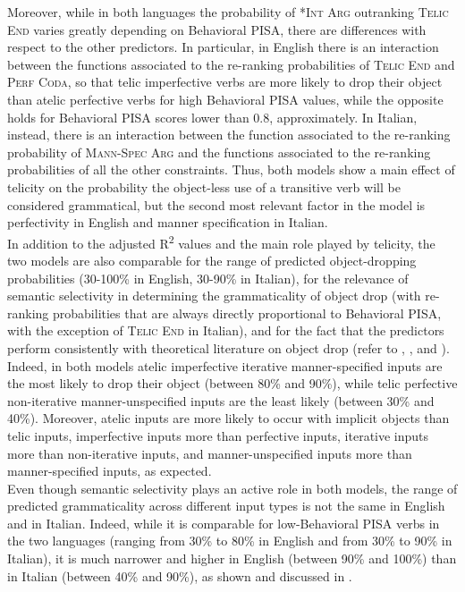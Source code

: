 Moreover, while in both languages the probability of \textsc{*Int Arg} outranking \textsc{Telic End} varies greatly depending on Behavioral PISA, there are differences with respect to the other predictors. In particular, in English there is an interaction between the functions associated to the re-ranking probabilities of \textsc{Telic End} and \textsc{Perf Coda}, so that telic imperfective verbs are more likely to drop their object than atelic perfective verbs for high Behavioral PISA values, while the opposite holds for Behavioral PISA scores lower than 0.8, approximately. In Italian, instead, there is an interaction between the function associated to the re-ranking probability of \textsc{Mann-Spec Arg} and the functions associated to the re-ranking probabilities of all the other constraints. Thus, both models show a main effect of telicity on the probability the object-less use of a transitive verb will be considered grammatical, but the second most relevant factor in the model is perfectivity in English and manner specification in Italian.\\
In addition to the adjusted R\textsuperscript{2} values and the main role played by telicity, the two models are also comparable for the range of predicted object-dropping probabilities (30-100\% in English, 30-90\% in Italian), for the relevance of semantic selectivity in determining the grammaticality of object drop (with re-ranking probabilities that are always directly proportional to Behavioral PISA, with the exception of \textsc{Telic End} in Italian), and for the fact that the predictors perform consistently with theoretical literature on object drop (refer to , , and ). Indeed, in both models atelic imperfective iterative manner-specified inputs are the most likely to drop their object (between 80\% and 90\%), while telic perfective non-iterative manner-unspecified inputs are the least likely (between 30\% and 40\%). Moreover, atelic inputs are more likely to occur with implicit objects than telic inputs, imperfective inputs more than perfective inputs, iterative inputs more than non-iterative inputs, and manner-unspecified inputs more than manner-specified inputs, as expected.\\
Even though semantic selectivity plays an active role in both models, the range of predicted grammaticality across different input types is not the same in English and in Italian. Indeed, while it is comparable for low-Behavioral PISA verbs in the two languages (ranging from 30\% to 80\% in English and from 30\% to 90\% in Italian), it is much narrower and higher in English (between 90\% and 100\%) than in Italian (between 40\% and 90\%), as shown and discussed in .


